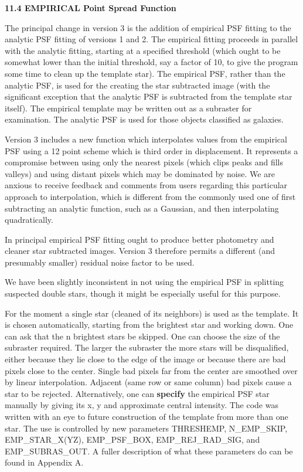 \centerline {\bf 11.4  EMPIRICAL Point Spread Function}

The principal change in version 3 is the addition of empirical PSF
fitting to the analytic PSF fitting of versions 1 and 2.  The
empirical fitting proceeds in parallel with the analytic fitting,
starting at a specified threshold (which ought to be somewhat lower
than the initial threshold, say a factor of 10, to give the program
some time to clean up the template star).  The empirical PSF, rather
than the analytic PSF, is used for the creating the star subtracted
image (with the significant exception that the analytic PSF is
subtracted from the template star itself).  The empirical template may
be written out as a subraster for examination.  The analytic PSF is
used for those objects classified as galaxies.

Version 3 includes a new function which interpolates values from
the empirical PSF using a 12 point scheme which is third order
in displacement.  It represents a compromise between using only
the nearest pixels (which clips peaks and fills valleys) and using
distant pixels which may be dominated by noise.  
We are anxious to receive feedback and comments from users regarding 
this particular approach to interpolation, which is different from 
the commonly used one of first subtracting an analytic function, such 
as a Gaussian, and then interpolating quadratically.

In principal empirical PSF fitting ought to produce better photometry
and cleaner star subtracted images.  Version 3 therefore permits a
different (and presumably smaller) residual noise factor to be used.

We have been slightly inconsistent in not using the empirical PSF in
splitting suspected double stars, though it might be especially useful
for this purpose.

For the moment a single star (cleaned of its neighbors) is used as the
template.  It is chosen automatically, starting from the brightest
star and working down.  One can ask that the n brightest stars be
skipped.  One can choose the size of the subraster required.  The
larger the subraster the more stars will be disqualified, either
because they lie close to the edge of the image or because there are
bad pixels close to the center.  Single bad pixels far from the center
are smoothed over by linear interpolation.  Adjacent (same row or same
column) bad pixels cause a star to be rejected.  
Alternatively, one can {\bf specify} the empirical PSF star manually
by giving its x, y and approximate central intensity.
The code was written
with an eye to future construction of the template from more than one
star. The use is controlled by new parameters THRESHEMP, N\_EMP\_SKIP, 
EMP\_STAR\_X(YZ), EMP\_PSF\_BOX, EMP\_REJ\_RAD\_SIG, and EMP\_SUBRAS\_OUT. A 
fuller description of what these parameters do can be found in Appendix A.

